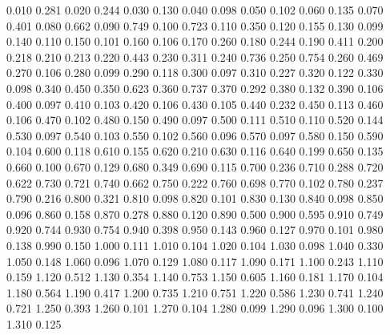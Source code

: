 0.010 0.281
0.020 0.244
0.030 0.130
0.040 0.098
0.050 0.102
0.060 0.135
0.070 0.401
0.080 0.662
0.090 0.749
0.100 0.723
0.110 0.350
0.120 0.155
0.130 0.099
0.140 0.110
0.150 0.101
0.160 0.106
0.170 0.260
0.180 0.244
0.190 0.411
0.200 0.218
0.210 0.213
0.220 0.443
0.230 0.311
0.240 0.736
0.250 0.754
0.260 0.469
0.270 0.106
0.280 0.099
0.290 0.118
0.300 0.097
0.310 0.227
0.320 0.122
0.330 0.098
0.340 0.450
0.350 0.623
0.360 0.737
0.370 0.292
0.380 0.132
0.390 0.106
0.400 0.097
0.410 0.103
0.420 0.106
0.430 0.105
0.440 0.232
0.450 0.113
0.460 0.106
0.470 0.102
0.480 0.150
0.490 0.097
0.500 0.111
0.510 0.110
0.520 0.144
0.530 0.097
0.540 0.103
0.550 0.102
0.560 0.096
0.570 0.097
0.580 0.150
0.590 0.104
0.600 0.118
0.610 0.155
0.620 0.210
0.630 0.116
0.640 0.199
0.650 0.135
0.660 0.100
0.670 0.129
0.680 0.349
0.690 0.115
0.700 0.236
0.710 0.288
0.720 0.622
0.730 0.721
0.740 0.662
0.750 0.222
0.760 0.698
0.770 0.102
0.780 0.237
0.790 0.216
0.800 0.321
0.810 0.098
0.820 0.101
0.830 0.130
0.840 0.098
0.850 0.096
0.860 0.158
0.870 0.278
0.880 0.120
0.890 0.500
0.900 0.595
0.910 0.749
0.920 0.744
0.930 0.754
0.940 0.398
0.950 0.143
0.960 0.127
0.970 0.101
0.980 0.138
0.990 0.150
1.000 0.111
1.010 0.104
1.020 0.104
1.030 0.098
1.040 0.330
1.050 0.148
1.060 0.096
1.070 0.129
1.080 0.117
1.090 0.171
1.100 0.243
1.110 0.159
1.120 0.512
1.130 0.354
1.140 0.753
1.150 0.605
1.160 0.181
1.170 0.104
1.180 0.564
1.190 0.417
1.200 0.735
1.210 0.751
1.220 0.586
1.230 0.741
1.240 0.721
1.250 0.393
1.260 0.101
1.270 0.104
1.280 0.099
1.290 0.096
1.300 0.100
1.310 0.125
